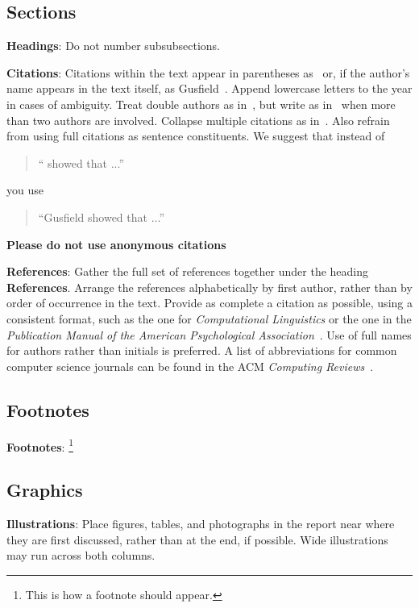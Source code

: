 \documentclass[11pt]{article}
\begin{document}
	\subsection{Sections}
	
	{\bf Headings}: Do not number subsubsections.
	
	{\bf Citations}: Citations within the text appear in parentheses
	as~\cite{Gusfield:97} or, if the author's name appears in the text
	itself, as Gusfield~.  Append lowercase letters
	to the year in cases of ambiguity.  Treat double authors as
	in~\cite{Aho:72}, but write as in~\cite{Chandra:81} when more than two
	authors are involved. Collapse multiple citations as
	in~\cite{Gusfield:97,Aho:72}. Also refrain from using full citations
	as sentence constituents. We suggest that instead of
	\begin{quote}
		``\cite{Gusfield:97} showed that ...''
	\end{quote}
	you use
	\begin{quote}
		``Gusfield    showed that ...''
	\end{quote}
	
	\textbf{Please do not use anonymous citations}
	
	\textbf{References}: Gather the full set of references together under
	the heading {\bf References}. Arrange the references alphabetically
	by first author, rather than by order of occurrence in the text.
	Provide as complete a citation as possible, using a consistent format,
	such as the one for {\em Computational Linguistics\/} or the one in the
	{\em Publication Manual of the American
		Psychological Association\/}~\cite{APA:83}. Use of full names for
	authors rather than initials is preferred.  A list of abbreviations
	for common computer science journals can be found in the ACM
	{\em Computing Reviews\/}~\cite{ACM:83}.
	
	\subsection{Footnotes}
	
	{\bf Footnotes}: \footnote{This is how a footnote should appear.}
	
	\subsection{Graphics}
	
	{\bf Illustrations}: Place figures, tables, and photographs in the
	report near where they are first discussed, rather than at the end, if
	possible.  Wide illustrations may run across both columns.
	
\end{document}
